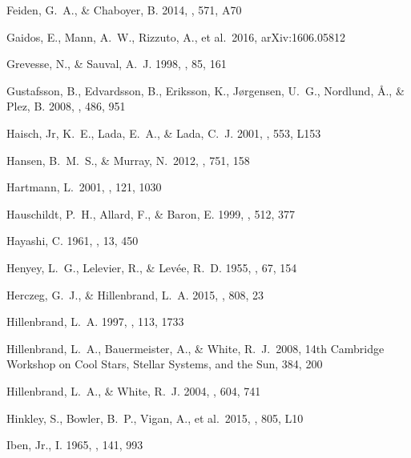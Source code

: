 \begin{thebibliography}{56}
{Feiden}, G.~A., \& {Chaboyer}, B. 2014{}, \aap, 571, A70

 Gaidos, E., Mann, A.~W., Rizzuto, A., et al.\ 2016, arXiv:1606.05812 

{Grevesse}, N., \& {Sauval}, A.~J. 1998, \ssr, 85, 161

{Gustafsson}, B., {Edvardsson}, B., {Eriksson}, K., {J{\o}rgensen}, U.~G.,
  {Nordlund}, {\AA}., \& {Plez}, B. 2008, \aap, 486, 951

Haisch, Jr, K.~E., Lada, E.~A., \& Lada, C.~J. 2001, \apj, 553, L153

 Hansen, B.~M.~S., \& Murray, N.\ 2012, \apj, 751, 158

 Hartmann, L.\ 2001, \aj, 121, 1030

{Hauschildt}, P.~H., {Allard}, F., \& {Baron}, E. 1999, \apj, 512, 377

{Hayashi}, C. 1961, \pasj, 13, 450

{Henyey}, L.~G., {Lelevier}, R., \& {Lev{\'e}e}, R.~D. 1955, \pasp, 67, 154

{Herczeg}, G.~J., \& {Hillenbrand}, L.~A. 2015, \apj, 808, 23

{Hillenbrand}, L.~A. 1997, \aj, 113, 1733

 Hillenbrand, L.~A., Bauermeister, A., \& White, R.~J.\ 2008, 14th Cambridge Workshop on Cool Stars, Stellar Systems, and the Sun, 384, 200 

{Hillenbrand}, L.~A., \& {White}, R.~J. 2004, \apj, 604, 741

 Hinkley, S., Bowler, B.~P., Vigan, A., et al.\ 2015, \apjl, 805, L10 

{Iben}, Jr., I. 1965, \apj, 141, 993


\end{thebibliography}
